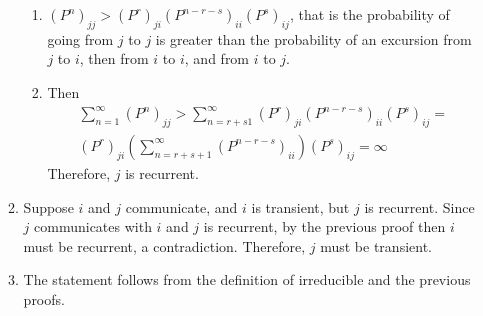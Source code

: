 \documentclass[12pt]{article}
\begin{document}
\begin{enumerate}
\begin{solution}
\begin{enumerate}
\begin{enumerate}
                \item
                    \( ( P^n)_{jj} > (P^r)_{ji}(P^{n-r-s})_{ii}(P^s)_{ij}
                    \), that is the probability of going from \( j \) to
                    \( j \) is greater than the probability of an
                    excursion from \( j \) to \( i \), then from \( i \)
                    to \( i \), and from \( i \) to \( j \).
                \item
                  Then
                  \begin{multline*}
                     \sum_{n=1}^{\infty}(P^n)_{jj} > \sum_{n=r+s1}^{\infty}
                     (P^r)_{ji}(P^{n-r-s})_{ii}(P^s)_{ij} = \\
                     (P^r)_{ji}\left(\sum_{n=r+s+1}^{\infty}(P^{n-r-s})_{ii}\right)(P^s)_{ij}
                     = \infty
                  \end{multline*}
                    Therefore, \( j \) is recurrent.
            \end{enumerate}
        \item
            Suppose \( i \) and \( j \) communicate, and \( i \) is
            transient, but \( j \) is recurrent.  Since \( j \)
            communicates with \( i \) and \( j \) is recurrent, by the
            previous proof then \( i \) must be recurrent, a
            contradiction. Therefore, \( j \) must be transient.
        \item
            The statement follows from the definition of irreducible and
            the previous proofs.
    \end{enumerate}
\end{solution}


\end{enumerate}
\end{document}
